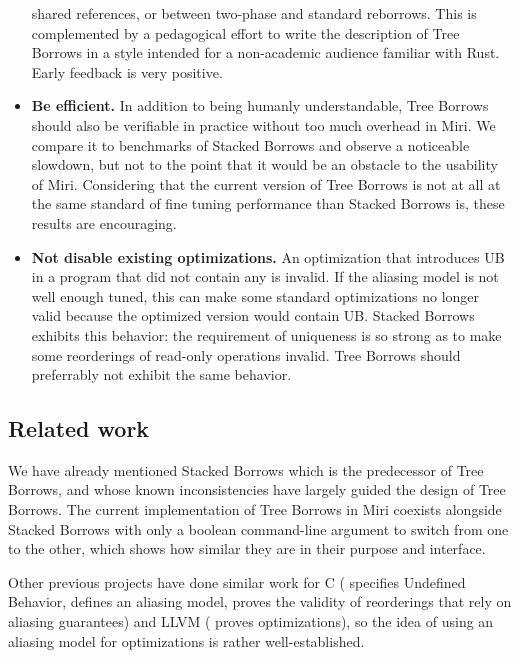 \documentclass[a4paper,11pt]{article}
\theoremstyle{plain}
\theoremstyle{definition}
\theoremstyle{remark}
\begin{document}
\begin{itemize}
        shared references, or between two-phase and standard reborrows.
        This is complemented by a pedagogical effort to write the
        description of Tree Borrows \cite{perso_treebor}
        in a style intended for a non-academic audience familiar with Rust.
        Early feedback is very positive.
    \item \textbf{Be efficient.} In addition to being humanly understandable, Tree Borrows
        should also be verifiable in practice without too much overhead in Miri.
        We compare it to benchmarks of Stacked Borrows and observe a noticeable slowdown,
        but not to the point that it would be an obstacle to the usability of Miri.
        Considering that the current version of Tree Borrows is not at all at the
        same standard of fine tuning performance than Stacked Borrows is, these
        results are encouraging.
    \item \textbf{Not disable existing optimizations.} An optimization that introduces
        UB in a program that did not contain any is invalid. If the aliasing model
        is not well enough tuned, this can make some standard optimizations no
        longer valid because the optimized version would contain UB.
        Stacked Borrows exhibits this behavior: the requirement of uniqueness
        is so strong as to make some reorderings of read-only operations invalid.
        Tree Borrows should preferrably not exhibit the same behavior.
\end{itemize}

\subsection{Related work}

We have already mentioned Stacked Borrows \cite{stacked_borrows} which is the
predecessor of Tree Borrows, and whose known inconsistencies have largely guided
the design of Tree Borrows. The current implementation of Tree Borrows in
Miri \cite{miri} coexists alongside Stacked Borrows with only a boolean
command-line argument to switch from one to the other, which shows how similar
they are in their purpose and interface.

Other previous projects have done similar work for C
(\cite{c_undef} specifies Undefined Behavior, \cite{c_aliasing_model} defines
an aliasing model, \cite{c_reorderings} proves the validity of reorderings that
rely on aliasing guarantees) and LLVM (\cite{llvm_opts} proves optimizations),
so the idea of using an aliasing model for optimizations is rather well-established.
\end{document}
